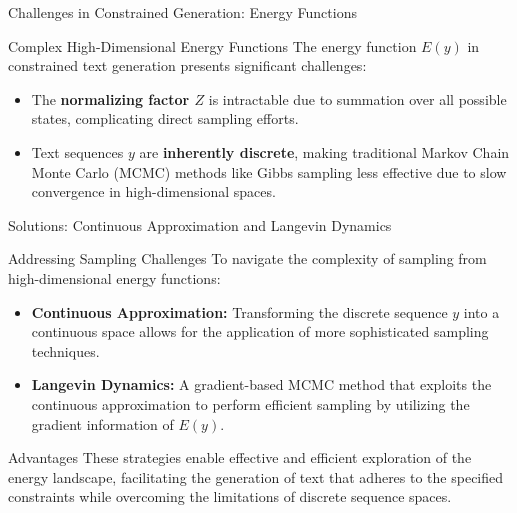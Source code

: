 \documentclass{beamer}
\begin{document}
\begin{frame}{Challenges in Constrained Generation: Energy Functions}
    \begin{block}{Complex High-Dimensional Energy Functions}
        The energy function $E(y)$ in constrained text generation presents significant challenges:
        \begin{itemize}
            \item The \textbf{normalizing factor $Z$} is intractable due to summation over all possible states, complicating direct sampling efforts.
            \item Text sequences $y$ are \textbf{inherently discrete}, making traditional Markov Chain Monte Carlo (MCMC) methods like Gibbs sampling less effective due to slow convergence in high-dimensional spaces.
        \end{itemize}
    \end{block}
\end{frame}

\begin{frame}{Solutions: Continuous Approximation and Langevin Dynamics}
    \begin{block}{Addressing Sampling Challenges}
        To navigate the complexity of sampling from high-dimensional energy functions:
        \begin{itemize}
            \item \textbf{Continuous Approximation:} Transforming the discrete sequence $y$ into a continuous space allows for the application of more sophisticated sampling techniques.
            \item \textbf{Langevin Dynamics:} A gradient-based MCMC method that exploits the continuous approximation to perform efficient sampling by utilizing the gradient information of $E(y)$.
        \end{itemize}
    \end{block}

    \begin{block}{Advantages}
        These strategies enable effective and efficient exploration of the energy landscape, facilitating the generation of text that adheres to the specified constraints while overcoming the limitations of discrete sequence spaces.
    \end{block}
\end{frame}
\end{document}
